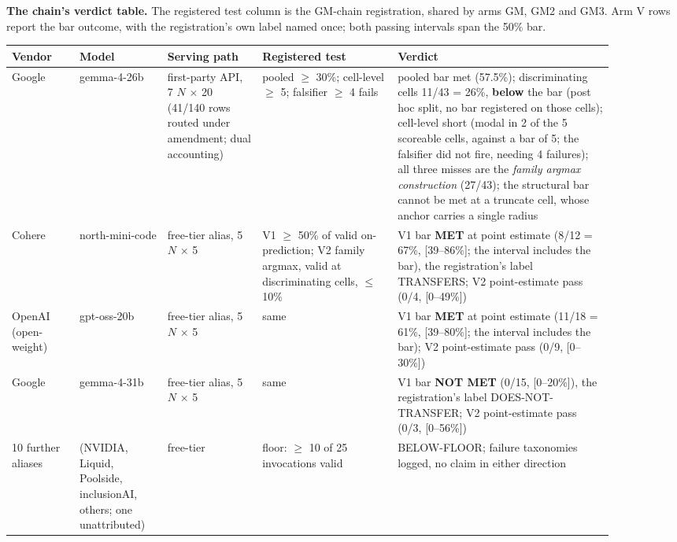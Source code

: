 \textbf{The chain's verdict table.} The registered test column is the GM-chain registration,
shared by arms GM, GM2 and GM3. Arm V rows report the bar outcome, with the registration's own label
named once; both passing intervals span the 50\% bar.

\begin{center}
\begin{small}
\setlength{\tabcolsep}{3.5pt}
\begin{tabular}{@{}p{0.10\linewidth}p{0.13\linewidth}p{0.14\linewidth}p{0.20\linewidth}p{0.32\linewidth}@{}}
\toprule
Vendor & Model & Serving path & Registered test & Verdict \\
\midrule
Google & gemma-4-26b & first-party API, 7 $N$ $\times$ 20 (41/140 rows routed under amendment; dual accounting) & pooled $\ge$ 30\%; cell-level $\ge$ 5; falsifier $\ge$ 4 fails & pooled bar met (57.5\%); discriminating cells 11/43 = 26\%, \textbf{below} the bar (post hoc split, no bar registered on those cells); cell-level short (modal in 2 of the 5 scoreable cells, against a bar of 5; the falsifier did not fire, needing 4 failures); all three misses are the \emph{family argmax construction} (27/43); the structural bar cannot be met at a truncate cell, whose anchor carries a single radius \\
Cohere & north-mini-code & free-tier alias, 5 $N$ $\times$ 5 & V1 $\ge$ 50\% of valid on-prediction; V2 family argmax, valid at discriminating cells, $\le$ 10\% & V1 bar \textbf{MET} at point estimate (8/12 = 67\%, [39--86\%]; the interval includes the bar), the registration's label TRANSFERS; V2 point-estimate pass (0/4, [0--49\%]) \\
OpenAI (open-weight) & gpt-oss-20b & free-tier alias, 5 $N$ $\times$ 5 & same & V1 bar \textbf{MET} at point estimate (11/18 = 61\%, [39--80\%]; the interval includes the bar); V2 point-estimate pass (0/9, [0--30\%]) \\
Google & gemma-4-31b & free-tier alias, 5 $N$ $\times$ 5 & same & V1 bar \textbf{NOT MET} (0/15, [0--20\%]), the registration's label DOES-NOT-TRANSFER; V2 point-estimate pass (0/3, [0--56\%]) \\
10 further aliases & (NVIDIA, Liquid, Poolside, inclusionAI, others; one unattributed) & free-tier & floor: $\ge$ 10 of 25 invocations valid & BELOW-FLOOR; failure taxonomies logged, no claim in either direction \\
\bottomrule
\end{tabular}
\end{small}
\end{center}


